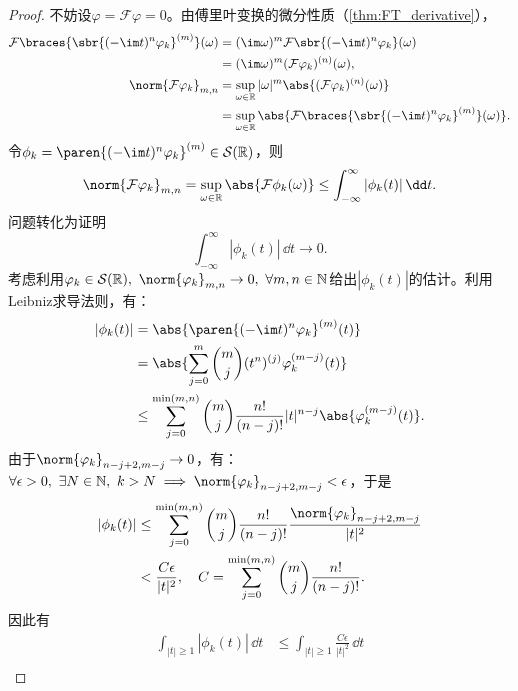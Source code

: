 \begin{proof}
    不妨设$\varphi=\mathcal{F}\varphi=0$。由傅里叶变换的微分性质（\cref{thm:FT_derivative}），
    \begin{align}
        \mathcal{F}\braces{\sbr{(-\im t)^n\varphi_k}^{(m)}}(\omega)&=(\im\omega)^m \mathcal{F}\sbr{(-\im t)^n \varphi_k}(\omega) \nonumber \\
        &=(\im\omega)^m (\mathcal{F}\varphi_k)^{(n)}(\omega), \\
        \norm{\mathcal{F}\varphi_k}_{m,n}&=\sup_{\omega\in\mathbb{R}}|\omega|^m\abs{(\mathcal{F}\varphi_k)^{(n)}(\omega)} \nonumber \\
        &=\sup_{\omega\in\mathbb{R}}\abs{\mathcal{F}\braces{\sbr{(-\im t)^n\varphi_k}^{(m)}}(\omega)}.
    \end{align}
    令$\phi_k=\paren{(-\im t)^n \varphi_k}^{(m)}\in\mathcal{S}(\mathbb{R})$，则
    \begin{equation}
        \norm{\mathcal{F}\varphi_k}_{m,n}=\sup_{\omega\in\mathbb{R}}\abs{\mathcal{F}\phi_k(\omega)}\leq \int_{-\infty}^{\infty}|\phi_k(t)|\,\dd t.
    \end{equation}
    问题转化为证明
    \begin{equation}
        \int_{-\infty}^{\infty}|\phi_k(t)|\,\dd t\to 0.
    \end{equation}
    考虑利用$\varphi_k\in\mathcal{S}(\mathbb{R}),\ \norm{\varphi_k}_{m,n}\to 0,\ \forall m,n\in\mathbb{N}$给出$|\phi_k(t)|$的估计。利用Leibniz求导法则，有：
    \begin{align}
        |\phi_k(t)|&=\abs{\paren{(-\im t)^n \varphi_k}^{(m)}(t)} \nonumber \\
        &=\abs{\sum_{j=0}^{m}\binom{m}{j}(t^n)^{(j)}\varphi_k^{(m-j)}(t)} \nonumber \\
        &\leq \sum_{j=0}^{\min(m,n)}\binom{m}{j}\frac{n!}{(n-j)!}|t|^{n-j}\abs{\varphi_k^{(m-j)}(t)}.
    \end{align}
    由于$\norm{\varphi_k}_{n-j+2,m-j}\to 0$，有：$\forall \epsilon>0,\ \exists N\in\mathbb{N},\ k>N\implies \norm{\varphi_k}_{n-j+2,m-j}<\epsilon$，于是
    \begin{align}
        |\phi_k(t)|&\leq \sum_{j=0}^{\min(m,n)}\binom{m}{j}\frac{n!}{(n-j)!}\frac{\norm{\varphi_k}_{n-j+2,m-j}}{|t|^2} \nonumber \\
        &<\frac{C\epsilon}{|t|^2},\quad C=\sum_{j=0}^{\min(m,n)}\binom{m}{j}\frac{n!}{(n-j)!}.
    \end{align}
    因此有
    \begin{align}
        \int_{|t|\geq 1}|\phi_k(t)|\,\dd t&\leq \int_{|t|\geq 1}\frac{C\epsilon}{|t|^2}\,\dd t \nonumber \\

\end{align}
\end{proof}

